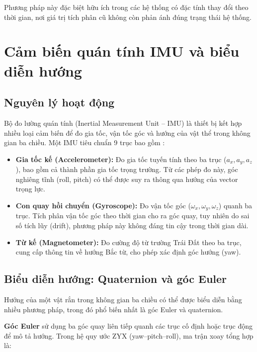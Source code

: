 Phương pháp này đặc biệt hữu ích trong các hệ thống có đặc tính thay đổi theo thời gian, nơi giá trị tích phân cũ không còn phản ánh đúng trạng thái hệ thống.

\section{Cảm biến quán tính IMU và biểu diễn hướng}

\subsection{Nguyên lý hoạt động}

Bộ đo lường quán tính (Inertial Measurement Unit -- IMU) là thiết bị kết hợp nhiều loại cảm biến để đo gia tốc, vận tốc góc và hướng của vật thể trong không gian ba chiều. Một IMU tiêu chuẩn 9 trục bao gồm \cite{madgwick2011}:

\begin{itemize}
    \item \textbf{Gia tốc kế (Accelerometer):} Đo gia tốc tuyến tính theo ba trục ($a_x, a_y, a_z$), bao gồm cả thành phần gia tốc trọng trường. Từ các phép đo này, góc nghiêng tĩnh (roll, pitch) có thể được suy ra thông qua hướng của vector trọng lực.

    \item \textbf{Con quay hồi chuyển (Gyroscope):} Đo vận tốc góc ($\omega_x, \omega_y, \omega_z$) quanh ba trục. Tích phân vận tốc góc theo thời gian cho ra góc quay, tuy nhiên do sai số tích lũy (drift), phương pháp này không đáng tin cậy trong thời gian dài.

    \item \textbf{Từ kế (Magnetometer):} Đo cường độ từ trường Trái Đất theo ba trục, cung cấp thông tin về hướng Bắc từ, cho phép xác định góc hướng (yaw).
\end{itemize}

\subsection{Biểu diễn hướng: Quaternion và góc Euler}

Hướng của một vật rắn trong không gian ba chiều có thể được biểu diễn bằng nhiều phương pháp, trong đó phổ biến nhất là góc Euler và quaternion.

\textbf{Góc Euler} sử dụng ba góc quay liên tiếp quanh các trục cố định hoặc trục động để mô tả hướng. Trong hệ quy ước ZYX (yaw--pitch--roll), ma trận xoay tổng hợp là:

